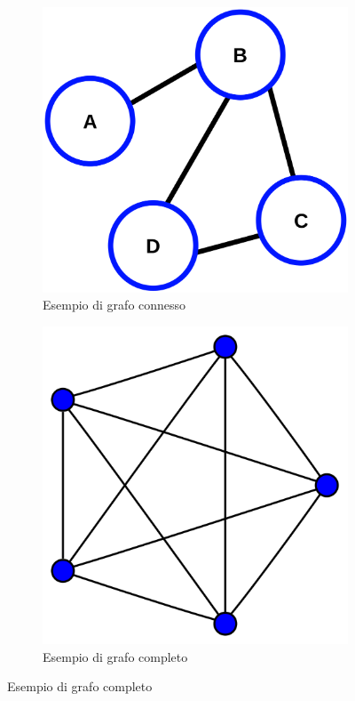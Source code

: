 \begin{figure}[!hb]
	\centering
	\begin{subfigure}[b]{0.45\textwidth}
		\centering
		\includegraphics[width=\textwidth]{img/CPT-Graphs-undirected-unweighted-ex1.svg.png}
		\caption{Esempio di grafo connesso}
		\label{fig:connected_graph_example}
	\end{subfigure}
	\hfill
	\begin{subfigure}[b]{0.45\textwidth}
		\centering
		\includegraphics[width=\textwidth]{img/4-simplex_graph.svg.png}
		\caption{Esempio di grafo completo}
		\label{fig:complete_graph_example}
	\end{subfigure}
\end{figure}

